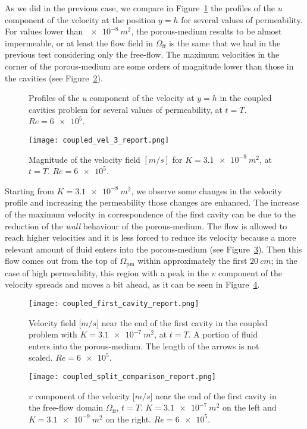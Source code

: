 As we did in the previous case, we compare in Figure~\ref{fig:md_wall_velocities} the profiles of the $u$ component of the velocity at the position $y=h$ for several values of permeability. For values lower than $\SI{e-8}{m^2}$, the porous-medium results to be almost impermeable, or at least the flow field in $\Omega_\text{ff}$ is the 
same that we had in the previous test considering only the free-flow. The maximum velocities in the 
corner of the porous-medium are some orders of magnitude lower than those in 
the cavities (see Figure~\ref{fig:coupled_vel_3}).
\begin{figure}
	\centering
	
	\caption[Profiles of the $u$ component of the velocity at $y=h$ in the coupled cavities problem]{Profiles of the $u$ component of the velocity at $y=h$ in the coupled cavities problem for several values of permeability, at $t=T$. $Re = \num{6e5}$.}
	\label{fig:md_wall_velocities}
\end{figure}
\begin{figure}
	\centering
	\texttt{[image: coupled\_vel\_3\_report.png]}
	\caption[Magnitude of the velocity field in the coupled problem]{Magnitude of the velocity field $[\si{m/s}]$ for $K=\SI{3.1e-9}{m^2}$, at $t=T$. $Re=\num{6e5}$.}
	\label{fig:coupled_vel_3}
\end{figure}

Starting from $K=\SI{3.1e-8}{m^2}$, we observe some changes in the velocity 
profile and increasing the permeability those changes are enhanced.
The increase of the maximum velocity in correspondence of the first cavity can 
be due to the reduction of the \emph{wall} behaviour of the porous-medium. The 
flow is allowed to reach higher velocities and it is less forced to reduce 
its velocity because a more relevant amount of fluid enters into the 
porous-medium (see Figure~\ref{fig:coupled_arrows}). Then this flow comes out 
from the top of $\Omega_\text{pm}$ within approximately the first 
$\SI{20}{cm}$; in the case of high permeability, this region with a peak in the 
$v$ component of the velocity spreads and 
moves a bit ahead, as it can be seen in Figure~\ref{fig:coupled_vel_split}.
\begin{figure}
	\centering
	\texttt{[image: coupled\_first\_cavity\_report.png]}
	\caption[Velocity field near the end of the first cavity in the coupled problem]{Velocity field [$\si{m/s}$] near the end of the first cavity in the coupled problem with $K=\SI{3.1e-7}{m^2}$, at $t=T$. A portion of fluid enters into the porous-medium. The length of the arrows is not scaled. $Re=\num{6e5}$.}
	\label{fig:coupled_arrows}
\end{figure}
\begin{figure}
	\centering
	\texttt{[image: coupled\_split\_comparison\_report.png]}
	\caption[$v$ component of the velocity near the end of the first cavity in the coupled problem]{$v$ component of the velocity [$\si{m/s}$] near the end of the first cavity in the free-flow domain $\Omega_\text{ff}$, $t=T$. $K = \SI{3.1e-7}{m^2}$ on the left and $K = \SI{3.1e-9}{m^2}$ on the right. $Re=\num{6e5}$.}
	\label{fig:coupled_vel_split}
\end{figure}

